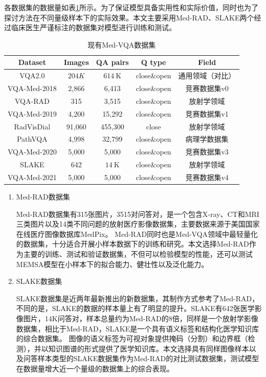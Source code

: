 各数据集的数据量如表\ref{tab:Date-set}所示。为了保证模型具备实用性和实际价值，同时也为了探讨方法在不同量级样本下的实际效果。本文主要采用Med-RAD、SLAKE两个经过临床医生严谨标注的数据集对模型进行训练和测试。
\begin{table}
	\caption{\label{tab:Date-set}现有Med-VQA数据集}
	\centering
	\small
	\begin{tabular}{c|cccc}
		\hline Dataset & Images & QA pairs & Q type & Field \\
		\hline VQA2.0 & $204 K$ & $614 \mathrm{~K}$ & close\&open & 通用领域（对比） \\
		VQA-Med-2018 & 2,866 & 6,413 & close\&open & 竞赛数据集v0 \\
		VQA-RAD & 315 & 3,515 & close\&open & 放射学领域 \\
		VQA-Med-2019 & 4,200 & 15,292 & close\&open  & 竞赛数据集v1 \\
		RadVisDial & 91,060 & 455,300 & close & 放射学领域 \\
		PathVQA & 4,998 & 32,799 & close\&open & 病理学数据集 \\
		VQA-Med-2020 & 5,000 & 5,000 & close\&open  & 竞赛数据集v3 \\
		SLAKE & 642 & $14 \mathrm{~K}$ & close\&open & 放射学领域 \\
		VQA-Med-2021 & 5,000 & 5,000 & close\&open & 竞赛数据集v4 \\
		\hline
	\end{tabular}
\end{table}
%
\begin{enumerate}[topsep = 0 pt, itemsep= 0 pt, parsep=0pt, partopsep=0pt, leftmargin=0pt, itemindent=44pt, labelsep=6pt, listparindent=22pt, label=(\arabic*)]
	\item Med-RAD数据集
	
	Med-RAD数据集有315张图片，3515对问答对，是一个包含X-ray、CT和MRI三类图片以及14类不同问题的放射医疗影像数据集，主要数据来源于美国国家在线医疗图像数据库MedPix。
	Med-RAD同时也是Med-VQA领域中最轻量化的数据集，十分适合开展小样本数据下的训练和研究。本文选择Med-RAD作为主要的训练、测试和验证数据集，不但可以检验模型的性能，还可以测试MEMSA模型在小样本下的拟合能力、健壮性以及泛化能力。
	\item SLAKE数据集
	
	SLAKE数据集是近两年最新推出的新数据集，其制作方式参考了Med-RAD，不同的是，SLAKE的数据的样本量上有了明显的提升。SLAKE有642张医学影像图片，14K问答对，样本总量约为Med-RAD的8倍，同样是一个放射学影像数据集，相比于Med-RAD，SLAKE是一个具有语义标签和结构化医学知识库的综合数据集。
	图像的语义标签为可视对象提供掩码（分割）和边界框（检测），并以知识图谱的形式提供了医学知识库。本文选择具有同样图像样本以及问答样本类型的SLAKE数据集作为Med-RAD的对比测试数据集，测试模型在数据量增大近一个量级的数据集上的综合表现。
\end{enumerate}


